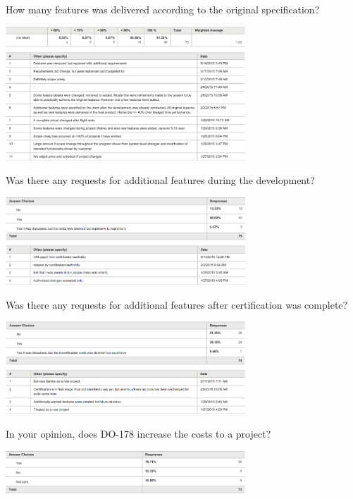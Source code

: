 \documentclass[conference]{IEEEtran}
\begin{document}
\begin{table}[t!]
\centering
\caption{How many features was delivered according to the original specification?}
\includegraphics[width=90mm]{How_many_features_was_delivered_according_to_the_original_specification.png}
\end{table}

\begin{table}[t!]
\centering
\caption{Was there any requests for additional features during the development?}
\includegraphics[width=90mm]{Was_there_any_requests_for_additional_features_during_the_development.png}
\end{table}

\begin{table}[t!]
\centering
\caption{Was there any requests for additional features after certification was complete?}
\includegraphics[width=90mm]{Was_there_any_requests_for_additional_features_after_certification_was_complete.png}
\end{table}

\begin{table}[t!]
\centering
\caption{In your opinion, does DO-178 increase the costs to a project?}
\includegraphics[width=90mm]{Does_increase_costs.png}
\end{table}
\end{document}
